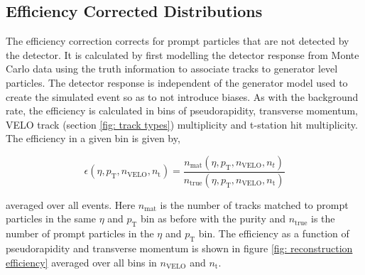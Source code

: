 \subsection{Efficiency Corrected Distributions}
\label{subsection: charged particle density, efficiency corrected distributions}

The efficiency correction corrects for prompt particles that are not detected by the detector. It is calculated by first modelling the detector response from Monte Carlo data using the truth information to associate tracks to generator level particles. The detector response is independent of the generator model used to create the simulated event so as to not introduce biases. As with the background rate, the efficiency is calculated in bins of pseudorapidity, transverse momentum, VELO track (section \ref{fig: track types}) multiplicity and t-station hit multiplicity. The efficiency in a given bin is given by,


\begin{equation}
	\epsilon(\eta, p_\mathrm{T}, n_\mathrm{VELO}, n_\mathrm{t}) = \frac{n_\mathrm{mat}(\eta, p_\mathrm{T}, n_\mathrm{VELO}, n_t)}{n_\mathrm{true}(\eta, p_\mathrm{T}, n_\mathrm{VELO}, n_\mathrm{t})}
\end{equation}

averaged over all events. Here $n_\mathrm{mat}$ is the number of tracks matched to prompt particles in the same $\eta$ and $p_\mathrm{T}$ bin as before with the purity and $n_\mathrm{true}$ is the number of prompt particles in the $\eta$ and $p_\mathrm{T}$ bin. The efficiency as a function of pseudorapidity and transverse momentum is shown in figure \ref{fig: reconstruction efficiency} averaged over all bins in $n_\mathrm{VELO}$ and $n_\mathrm{t}$.


